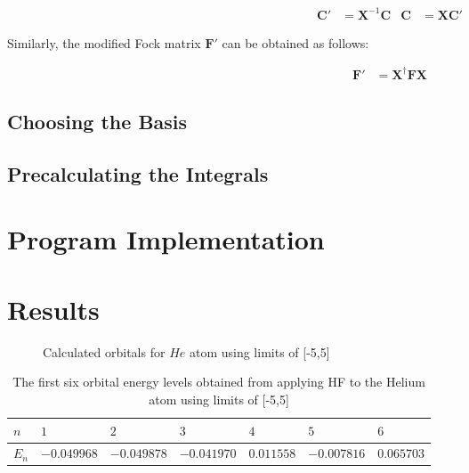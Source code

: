 \documentclass[10pt, oneside, letterpaper]{article}
\begin{document}
\begin{align*}
\bm{C}' &= \bm{X}^{-1}\bm{C} & \bm{C} &= \bm{X}\bm{C}'
\end{align*}

Similarly, the modified Fock matrix $\bm{F}'$ can be obtained as follows:

\begin{align*}
\bm{F}' &= \bm{X}^\dagger\bm{F}\bm{X}
\end{align*}

\subsection{Choosing the Basis}


\subsection{Precalculating the Integrals}



\newpage
\section{Program Implementation}


\newpage
\section{Results}

\begin{figure}[H]
  \begin{center}
  \end{center}
  \caption{Calculated orbitals for $He$ atom using limits of [-5,5]}
  \label{he-plot}
\end{figure}

\begin{table}[H]
\begin{center}
\begin{tabular}{l|llllll}\hline
$n$    & $1$    & $2$     & $3$     & $4$      & $5$      & $6$      \\\hline
$E_n$  & $-0.049968$  & $-0.049878$  & $-0.041970$  & $0.011558$  & $-0.007816$  & $0.065703$ \\\hline
\end{tabular}
\end{center}
  \caption{The first six orbital energy levels obtained from applying HF to the Helium atom using limits of [-5,5]}
  \label{orbital-energies-he}
\end{table}
\end{document}
